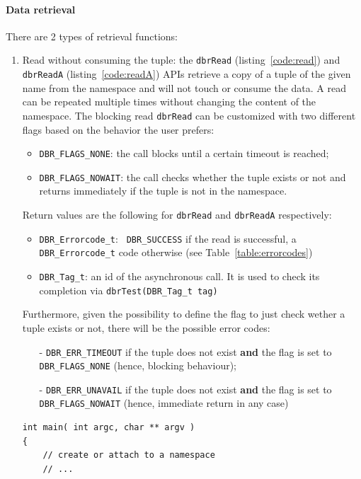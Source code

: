 \paragraph{Data retrieval} There are 2 types of retrieval functions:
\begin{enumerate}
\item Read without consuming the tuple: the \texttt{dbrRead} (listing~\ref{code:read}) and
  \texttt{dbrReadA} (listing~\ref{code:readA}) APIs retrieve a copy of a tuple of the given name from the
  namespace and will not touch or consume the data.  A read can be
  repeated multiple times without changing the content of the
  namespace.
  The blocking read \texttt{dbrRead} can be customized with two different flags based on the behavior the user prefers:
  \begin{itemize}
  	\item \texttt{DBR\_FLAGS\_NONE}: the call blocks until a certain timeout is reached;
    \item \texttt{DBR\_FLAGS\_NOWAIT}: the call checks whether the tuple exists or not and returns immediately if the tuple is not in the namespace.
  \end{itemize}

Return values are the following  for \texttt{dbrRead} and \texttt{dbrReadA} respectively:
\begin{itemize}
	\item \texttt{DBR\_Errorcode\_t}: \texttt{ DBR\_SUCCESS} if the read is successful, a \texttt{DBR\_Errorcode\_t} code otherwise (see Table~\ref{table:errorcodes}) 
	\item \texttt{DBR\_Tag\_t}: an id of the asynchronous call. It is used to check its completion via \texttt{dbrTest(DBR\_Tag\_t tag)}
\end{itemize}

Furthermore, given the possibility to define the flag to just check wether a tuple exists or not, there will be the possible error codes:
\begin{itemize}
	\item[-] \texttt{DBR\_ERR\_TIMEOUT} if the tuple does not exist \textbf{and} the flag is set to \texttt{DBR\_FLAGS\_NONE} (hence, blocking behaviour);
	\item [-] \texttt{DBR\_ERR\_UNAVAIL} if the tuple does not exist \textbf{and} the flag is set to \texttt{DBR\_FLAGS\_NOWAIT} (hence, immediate return in any case)
\end{itemize}

\begin{lstlisting}[style=mystyle,basicstyle=\scriptsize\ttfamily,caption=Read data from the namespace (blocking), label=code:read]
int main( int argc, char ** argv )
{
	// create or attach to a namespace
	// ...
	

\end{lstlisting}
\end{enumerate}
